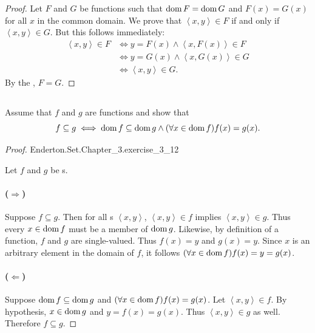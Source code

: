 \documentclass{report}
\begin{document}
\begin{proof}


  Let $F$ and $G$ be functions such that $\mathop{\text{dom}}{F} = \mathop{\text{dom}}{G}$ and $F(x) = G(x)$
    for all $x$ in the common domain.
  We prove that $\left< x, y \right> \in F$ if and only if
    $\left< x, y \right> \in G$.
  But this follows immediately:
    \begin{align*}
      \left< x, y \right> \in F
        & \iff y = F(x) \land \left< x, F(x) \right> \in F \\
        & \iff y = G(x) \land \left< x, G(x) \right> \in G \\
        & \iff \left< x, y \right> \in G.
    \end{align*}
  By the , $F = G$.

\end{proof}

\subsection{}%
\label{sub:exercise-3.12}

Assume that $f$ and $g$ are functions and show that
  $$f \subseteq g \iff \mathop{\text{dom}}{f} \subseteq \mathop{\text{dom}}{g} \land
    (\forall x \in \mathop{\text{dom}}{f}) f(x) = g(x).$$

\begin{proof}

    {Enderton.Set.Chapter\_3.exercise\_3\_12}

  Let $f$ and $g$ be s.

  \paragraph{($\Rightarrow$)}%

    Suppose $f \subseteq g$.
    Then for all s $\left< x, y \right>$,
      $\left< x, y \right> \in f$ implies $\left< x, y \right> \in g$.
    Thus every $x \in \mathop{\text{dom}}{f}$ must be a member of $\mathop{\text{dom}}{g}$.
    Likewise, by definition of a function, $f$ and $g$ are single-valued.
    Thus $f(x) = y$ and $g(x) = y$.
    Since $x$ is an arbitrary element in the domain of $f$, it follows
      $(\forall x \in \mathop{\text{dom}}{f}) f(x) = y = g(x)$.

  \paragraph{($\Leftarrow$)}%

    Suppose $\mathop{\text{dom}}{f} \subseteq \mathop{\text{dom}}{g}$ and
      $(\forall x \in \mathop{\text{dom}}{f}) f(x) = g(x)$.
    Let $\left< x, y \right> \in f$.
    By hypothesis, $x \in \mathop{\text{dom}}{g}$ and $y = f(x) = g(x)$.
    Thus $\left< x, y \right> \in g$ as well.
    Therefore $f \subseteq g$.

\end{proof}
\end{document}
